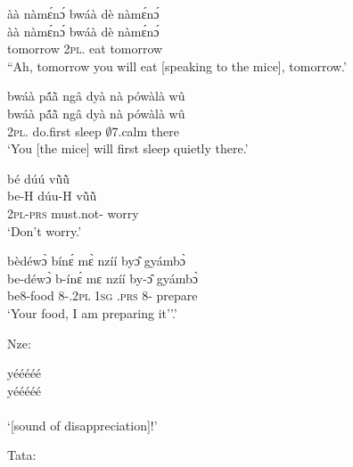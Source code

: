 \begin{exe}[(N234)]
\exN\label{n189}
  \glll àà nàmɛ́nɔ́ bwáà dè nàmɛ́nɔ́ \\
        àà nàmɛ́nɔ́ bwáà dè nàmɛ́nɔ́ \\
       {\EXCL} tomorrow 2\textsc{pl}.{\FUT} eat tomorrow  \\
    \trans ``Ah, tomorrow you will eat [speaking to the mice], tomorrow.'
 
\exN\label{n190}
  \glll bwáà pã́ã̀ ngâ dyà nà pówàlà wû \\
        bwáà pã́ã̀ ngâ dyà nà pówàlà wû \\
        2\textsc{pl}.{\FUT} do.first {\PL}  sleep {\COM} $\emptyset$7.calm there \\
    \trans `You [the mice] will first sleep quietly there.'
 
\exN\label{n191}
  \glll bé dúú vũ̀ũ̀ \\
      be-H dúu-H vũ̀ũ̀ \\
        2\textsc{pl}-\textsc{prs} must.not-{\R} worry \\
    \trans `Don't worry.'
 
\exN\label{n192} 
  \glll bèdéwɔ̀ bínɛ́ mɛ̀ nzíí byɔ̂ gyámbɔ̀ \\
      be-déwɔ̀ b-ínɛ́ mɛ nzíí by-ɔ̂ gyámbɔ̀ \\
       be8-food 8-{\POSS}.2\textsc{pl} 1\textsc{sg} {\PROG}.\textsc{prs} 8-{\OBJ} prepare  \\
    \trans `Your food, I am preparing it''.'
\end{exe}

\noindent Nze:

\begin{exe}[(N234)]
\exN\label{n193}
  \glll yééééé \\
        yééééé \\
        {\EXCL} \\
    \trans `[sound of disappreciation]!'
\end{exe}

\noindent Tata:

